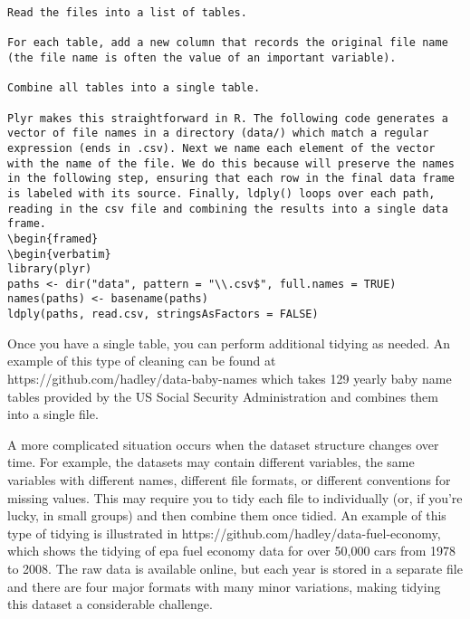 \begin{framed}
\begin{verbatim}
Read the files into a list of tables.

For each table, add a new column that records the original file name (the file name is often the value of an important variable).

Combine all tables into a single table.

Plyr makes this straightforward in R. The following code generates a vector of file names in a directory (data/) which match a regular expression (ends in .csv). Next we name each element of the vector with the name of the file. We do this because will preserve the names in the following step, ensuring that each row in the final data frame is labeled with its source. Finally, ldply() loops over each path, reading in the csv file and combining the results into a single data frame.
\begin{framed}
\begin{verbatim}
library(plyr)
paths <- dir("data", pattern = "\\.csv$", full.names = TRUE)
names(paths) <- basename(paths)
ldply(paths, read.csv, stringsAsFactors = FALSE)
\end{verbatim}
\end{framed}
Once you have a single table, you can perform additional tidying as needed. An example of this type of cleaning can be found at https://github.com/hadley/data-baby-names which takes 129 yearly baby name tables provided by the US Social Security Administration and combines them into a single file.

A more complicated situation occurs when the dataset structure changes over time. For example, the datasets may contain different variables, the same variables with different names, different file formats, or different conventions for missing values. This may require you to tidy each file to individually (or, if you're lucky, in small groups) and then combine them once tidied. An example of this type of tidying is illustrated in https://github.com/hadley/data-fuel-economy, which shows the tidying of epa fuel economy data for over 50,000 cars from 1978 to 2008. The raw data is available online, but each year is stored in a separate file and there are four major formats with many minor variations, making tidying this dataset a considerable challenge.

